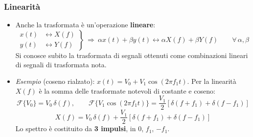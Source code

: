 \documentclass[12pt, a4paper]{article}
\begin{document}
\subsubsection{Linearità}
\begin{itemize}
    \item Anche la trasformata è un'operazione \textbf{lineare}:
    $$\left.\begin{aligned}x(t)&\longleftrightarrow X(f)\\y(t)&\longleftrightarrow Y(f)\end{aligned}\right\}\ \Longrightarrow\ \alpha x(t)+\beta y(t)\longleftrightarrow\alpha X(f)+\beta Y(f)\qquad\forall\,\alpha,\beta$$
    Si conosce subito la trasformata di segnali ottenuti come combinazioni lineari di segnali di trasformata nota.
    \item \textit{Esempio} (coseno rialzato): $x(t)=V_0+V_1\cos(2\pi f_1t)$. Per la linearità $X(f)$ è la somma delle trasformate notevoli di costante e coseno:
    $$\mathcal{F}\{V_0\}=V_0\,\delta(f),\qquad \mathcal{F}\{V_1\cos(2\pi f_1t)\}=\frac{V_1}{2}\left[\delta(f+f_1)+\delta(f-f_1)\right]$$
    $$X(f)=V_0\,\delta(f)+\frac{V_1}{2}\left[\delta(f+f_1)+\delta(f-f_1)\right]$$
    Lo spettro è costituito da \textbf{3 impulsi}, in $0$, $f_1$, $-f_1$.
\end{itemize}
\end{document}
